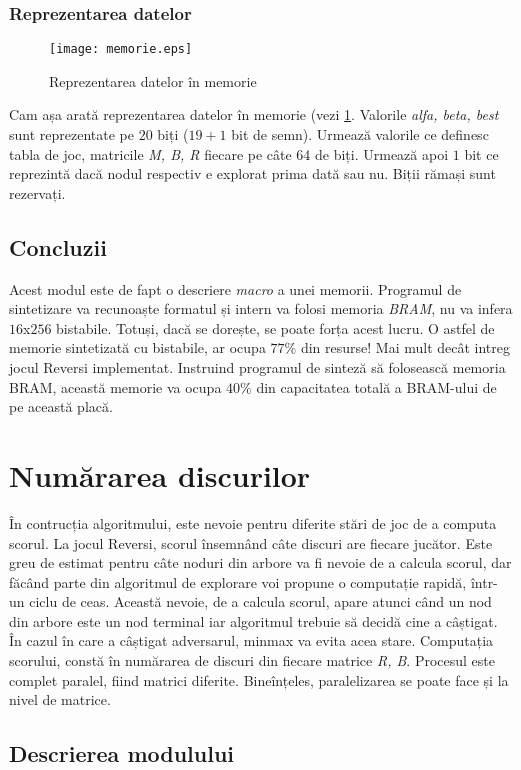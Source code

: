 \documentclass[12pt,twoside,a4paper,fleqn]{book}
\theoremstyle{definition}
\begin{document}
\subsubsection{Reprezentarea datelor}
\begin{figure}[h]
\texttt{[image: memorie.eps]}
\caption{\small{Reprezentarea datelor în memorie}}
\label{fig:dia_mem}
\end{figure}

Cam așa arată reprezentarea datelor în memorie (vezi \ref{fig:dia_mem}. Valorile \emph{alfa, beta, best} sunt reprezentate pe $20$ biți ($19 + 1$ bit de semn). Urmează valorile ce definesc tabla de joc, matricile \emph{M, B, R} fiecare pe câte $64$ de biți. Urmează apoi $1$ bit ce reprezintă dacă nodul respectiv e explorat prima dată sau nu. Biții rămași sunt rezervați.

\subsection{Concluzii}
Acest modul este de fapt o descriere \emph{macro} a unei memorii. Programul de sintetizare va recunoaște formatul și intern va folosi memoria \emph{BRAM}, nu va infera $16$x$256$ bistabile. Totuși, dacă se dorește, se poate forța acest lucru. O astfel de memorie sintetizată cu bistabile, ar ocupa $77\%$ din resurse! Mai mult decât intreg jocul Reversi implementat. Instruind programul de sinteză să folosească memoria BRAM, această memorie va ocupa $40\%$ din capacitatea totală a BRAM-ului de pe această placă.

\section{Numărarea discurilor}
\label{modul_RB_cnt}
În contrucția algoritmului, este nevoie pentru diferite stări de joc de a computa scorul. La jocul Reversi, scorul însemnând câte discuri are fiecare jucător. Este greu de estimat pentru câte noduri din arbore va fi nevoie de a calcula scorul, dar făcând parte din algoritmul de explorare voi propune o computație rapidă, într-un ciclu de ceas. Această nevoie, de a calcula scorul, apare atunci când un nod din arbore este un nod terminal iar algoritmul trebuie să decidă cine a câștigat. În cazul în care a câștigat adversarul, minmax va evita acea stare. Computația scorului, constă în numărarea de discuri din fiecare matrice \emph{R, B}. Procesul este complet paralel, fiind matrici diferite. Bineînțeles, paralelizarea se poate face și la nivel de matrice.
\subsection{Descrierea modulului}
\end{document}
